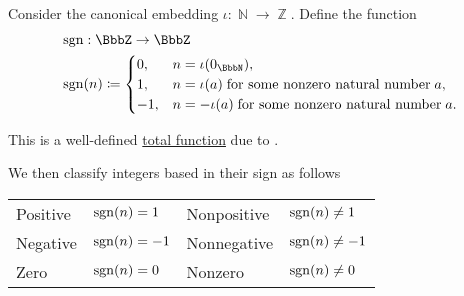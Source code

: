 \begin{definition}\label{def:integer_signum}
  Consider the canonical embedding \( \iota: \BbbN \to \BbbZ \). Define the  function
  \begin{equation*}
    \begin{aligned}
      &\sgn: \BbbZ \to \BbbZ \\
      &\sgn(n) \coloneqq \begin{cases}
        0,  &n = \iota(0_\BbbN), \\
        1,  &n = \iota(a) \T{for some nonzero natural number} a, \\
        -1, &n = -\iota(a) \T{for some nonzero natural number} a.
      \end{cases}
    \end{aligned}
  \end{equation*}

  This is a well-defined \hyperref[def:set_valued_map/partial]{total function} due to .

  We then classify integers based in their sign as follows
  \begin{center}
    \begin{tabular}{l | l || l | l}
      Positive    & \( \operatorname{sgn}(n) = 1 \)  & Nonpositive & \( \operatorname{sgn}(n) \neq 1 \) \\
      Negative    & \( \operatorname{sgn}(n) = -1 \) & Nonnegative & \( \operatorname{sgn}(n) \neq -1 \) \\
      Zero        & \( \operatorname{sgn}(n) = 0 \)  & Nonzero     & \( \operatorname{sgn}(n) \neq 0 \) \\
    \end{tabular}
  \end{center}
\end{definition}

